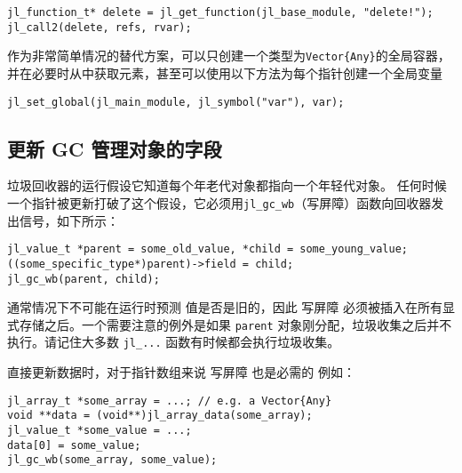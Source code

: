 \begin{lstlisting}
jl_function_t* delete = jl_get_function(jl_base_module, "delete!");
jl_call2(delete, refs, rvar);
\end{lstlisting}



作为非常简单情况的替代方案，可以只创建一个类型为\texttt{Vector\{Any\}}的全局容器，并在必要时从中获取元素，甚至可以使用以下方法为每个指针创建一个全局变量




\begin{lstlisting}
jl_set_global(jl_main_module, jl_symbol("var"), var);
\end{lstlisting}



\hypertarget{2772518371024501588}{}


\subsection{更新 GC 管理对象的字段}



垃圾回收器的运行假设它知道每个年老代对象都指向一个年轻代对象。 任何时候一个指针被更新打破了这个假设，它必须用\texttt{jl\_gc\_wb}（写屏障）函数向回收器发出信号，如下所示：




\begin{lstlisting}
jl_value_t *parent = some_old_value, *child = some_young_value;
((some_specific_type*)parent)->field = child;
jl_gc_wb(parent, child);
\end{lstlisting}



通常情况下不可能在运行时预测 值是否是旧的，因此 写屏障 必须被插入在所有显式存储之后。一个需要注意的例外是如果 \texttt{parent} 对象刚分配，垃圾收集之后并不执行。请记住大多数 \texttt{jl\_...} 函数有时候都会执行垃圾收集。



直接更新数据时，对于指针数组来说 写屏障 也是必需的 例如：




\begin{lstlisting}
jl_array_t *some_array = ...; // e.g. a Vector{Any}
void **data = (void**)jl_array_data(some_array);
jl_value_t *some_value = ...;
data[0] = some_value;
jl_gc_wb(some_array, some_value);
\end{lstlisting}



\hypertarget{13611710259554554355}{}


